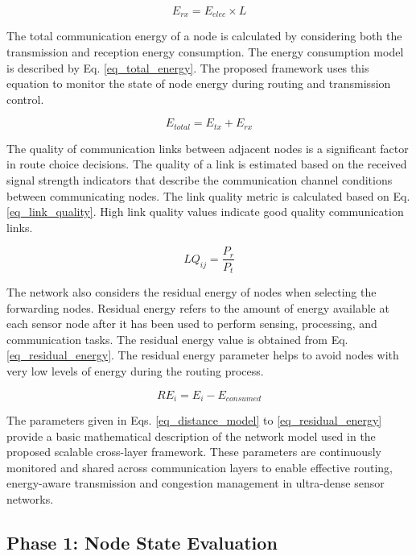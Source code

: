 \documentclass[a4paper,fleqn]{cas-dc}
\numberwithin{equation}{section}
\begin{document}
\begin{equation}
E_{rx} = E_{elec} \times L
\label{eq_reception_energy}
\end{equation}

The total communication energy of a node is calculated by considering both the transmission and reception energy consumption. The energy consumption model is described by Eq. \ref{eq_total_energy}. The proposed framework uses this equation to monitor the state of node energy during routing and transmission control.

\begin{equation}
E_{total} = E_{tx} + E_{rx}
\label{eq_total_energy}
\end{equation}

The quality of communication links between adjacent nodes is a significant factor in route choice decisions. The quality of a link is estimated based on the received signal strength indicators that describe the communication channel conditions between communicating nodes. The link quality metric is calculated based on Eq. \ref{eq_link_quality}. High link quality values indicate good quality communication links.

\begin{equation}
LQ_{ij} = \frac{P_r}{P_t}
\label{eq_link_quality}
\end{equation}

The network also considers the residual energy of nodes when selecting the forwarding nodes. Residual energy refers to the amount of energy available at each sensor node after it has been used to perform sensing, processing, and communication tasks. The residual energy value is obtained from Eq. \ref{eq_residual_energy}. The residual energy parameter helps to avoid nodes with very low levels of energy during the routing process.

\begin{equation}
RE_i = E_i - E_{consumed}
\label{eq_residual_energy}
\end{equation}

The parameters given in Eqs. \ref{eq_distance_model} to \ref{eq_residual_energy} provide a basic mathematical description of the network model used in the proposed scalable cross-layer framework. These parameters are continuously monitored and shared across communication layers to enable effective routing, energy-aware transmission and congestion management in ultra-dense sensor networks.

\subsection{Phase 1: Node State Evaluation}
\end{document}
